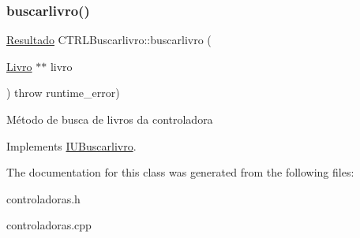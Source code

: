 \subsubsection{\texorpdfstring{buscarlivro()}{buscarlivro()}}
{\footnotesize\ttfamily \hyperlink{classResultado}{Resultado} C\+T\+R\+L\+Buscarlivro\+::buscarlivro (\begin{DoxyParamCaption}\item[{\hyperlink{classLivro}{Livro} $\ast$$\ast$}]{livro }\end{DoxyParamCaption}) throw  runtime\+\_\+error) \hspace{0.3cm}{\ttfamily [virtual]}}

Método de busca de livros da controladora 

Implements \hyperlink{classIUBuscarlivro}{I\+U\+Buscarlivro}.



The documentation for this class was generated from the following files\+:\begin{DoxyCompactItemize}
\item 
controladoras.\+h\item 
controladoras.\+cpp\end{DoxyCompactItemize}
